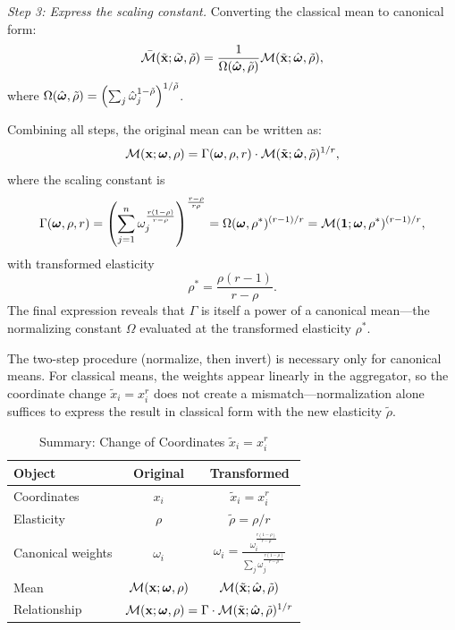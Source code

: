 \textit{Step 3: Express the scaling constant.} Converting the classical mean to canonical form:
\[
\bar{\mathcal{M}}(\tilde{\mathbf{x}}; \tilde{\boldsymbol{\omega}}, \tilde{\rho}) = \frac{1}{\Omega(\hat{\boldsymbol{\omega}}, \tilde{\rho})} \mathcal{M}(\tilde{\mathbf{x}}; \hat{\boldsymbol{\omega}}, \tilde{\rho}),
\]
where $\Omega(\hat{\boldsymbol{\omega}}, \tilde{\rho}) = \left( \sum_j \hat{\omega}_j^{1-\tilde{\rho}} \right)^{1/\tilde{\rho}}$.

Combining all steps, the original mean can be written as:
\begin{equation}
\label{eq:coord-change-mean}
\mathcal{M}(\mathbf{x}; \boldsymbol{\omega}, \rho) = \Gamma(\boldsymbol{\omega}, \rho, r) \cdot \mathcal{M}(\tilde{\mathbf{x}}; \hat{\boldsymbol{\omega}}, \tilde{\rho})^{1/r},
\end{equation}
where the scaling constant is
\begin{equation}
\label{eq:Gamma-def}
\Gamma(\boldsymbol{\omega}, \rho, r) = \left( \sum_{j=1}^{n} \omega_j^{\frac{r(1-\rho)}{r-\rho}} \right)^{\frac{r-\rho}{r\rho}} = \Omega(\boldsymbol{\omega}, \rho^*)^{(r-1)/r} = \mathcal{M}(\mathbf{1}; \boldsymbol{\omega}, \rho^*)^{(r-1)/r},
\end{equation}
with transformed elasticity
\begin{equation}
\label{eq:rho-star}
\rho^* = \frac{\rho(r-1)}{r-\rho}.
\end{equation}
The final expression reveals that $\Gamma$ is itself a power of a canonical mean---the normalizing constant $\Omega$ evaluated at the transformed elasticity $\rho^*$.

\begin{calloutnote}
The two-step procedure (normalize, then invert) is necessary only for canonical means. For classical means, the weights appear linearly in the aggregator, so the coordinate change $\tilde{x}_i = x_i^r$ does not create a mismatch---normalization alone suffices to express the result in classical form with the new elasticity $\tilde{\rho}$.
\end{calloutnote}

\begin{table}[H]
\centering
\caption{Summary: Change of Coordinates $\tilde{x}_i = x_i^r$}
\label{tab:coord-change-summary}
\begin{tabular}{@{}lcc@{}}
\toprule
\textbf{Object} & \textbf{Original} & \textbf{Transformed} \\
\midrule
Coordinates & $x_i$ & $\tilde{x}_i = x_i^r$ \\[0.5em]
Elasticity & $\rho$ & $\tilde{\rho} = \rho/r$ \\[0.5em]
Canonical weights & $\omega_i$ & $\displaystyle\hat{\omega}_i = \frac{\omega_i^{\frac{r(1-\rho)}{r-\rho}}}{\sum_j \omega_j^{\frac{r(1-\rho)}{r-\rho}}}$ \\[1.5em]
Mean & $\mathcal{M}(\mathbf{x}; \boldsymbol{\omega}, \rho)$ & $\mathcal{M}(\tilde{\mathbf{x}}; \hat{\boldsymbol{\omega}}, \tilde{\rho})$ \\[0.5em]
Relationship & \multicolumn{2}{c}{$\mathcal{M}(\mathbf{x}; \boldsymbol{\omega}, \rho) = \Gamma \cdot \mathcal{M}(\tilde{\mathbf{x}}; \hat{\boldsymbol{\omega}}, \tilde{\rho})^{1/r}$} \\
\bottomrule
\end{tabular}
\end{table}

